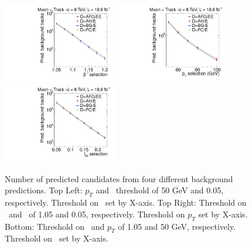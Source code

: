 \begin{figure}
 \begin{center}
  \includegraphics[clip=true, trim=0.0cm 0cm 2.8cm 0cm,width=0.44\textwidth]{figures/tkmu/Systematics_Data8TeV_TOF_Value}
  \includegraphics[clip=true, trim=0.0cm 0cm 2.8cm 0cm,width=0.44\textwidth]{figures/tkmu/Systematics_Data8TeV_P_Value} \\
  \includegraphics[clip=true, trim=0.0cm 0cm 2.8cm 0cm,width=0.44\textwidth]{figures/tkmu/Systematics_Data8TeV_I_Value}
 \end{center}
 \caption{Number of predicted candidates from four different background predictions. Top Left: $p_T$ and \ias\ threshold of 50 GeV and 0.05, respectively.
Threshold on \invbeta\ set by X-axis. Top Right: Threshold on \invbeta\  and \ias\ of 1.05 and 0.05, respectively. Threshold on $p_T$ set by X-axis.
Bottom: Threshold on \invbeta\ and $p_T$ of 1.05 and 50 GeV, respectively. Threshold on \ias\ set by X-axis. 
\label{fig:TkMuMultPred}}
\end{figure}

